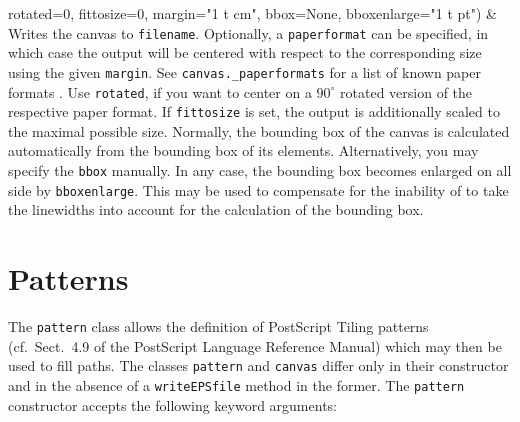 \begin{tabularx}
{      \newline\phantom{writeEPSfile(}rotated=0,
      \newline\phantom{writeEPSfile(}fittosize=0, 
      \newline\phantom{writeEPSfile(}margin="1 t cm",
      \newline\phantom{writeEPSfile(}bbox=None,
      \newline\phantom{writeEPSfile(}bboxenlarge="1 t pt")} &
  Writes the canvas to \texttt{filename}. Optionally, a
  \texttt{paperformat} can be specified, in which case the output will
  be centered with respect to the corresponding size using the given
  \texttt{margin}. See \texttt{canvas.\_paperformats} for a list of
  known paper formats . Use \texttt{rotated}, if you want to center on
  a $90^\circ$ rotated version of the respective paper format. If
  \texttt{fittosize} is set, the output is additionally scaled to the
  maximal possible size. Normally, the bounding box of the canvas is 
  calculated automatically from the bounding box of its elements.
  Alternatively, you may specify the \texttt{bbox} manually. In any
  case, the bounding box becomes enlarged on all side by
  \texttt{bboxenlarge}. This may be used to compensate for the
  inability of \PyX{} to take the linewidths into account for the
  calculation of the bounding box.
\end{tabularx} 
\medskip

\section{Patterns}

The \texttt{pattern} class allows the definition of PostScript Tiling
patterns (cf.\ Sect.~4.9 of the PostScript Language Reference Manual)
which may then be used to fill paths. The classes \texttt{pattern} and
\texttt{canvas} differ only in their constructor and in the absence of
a \texttt{writeEPSfile} method in the former. The \texttt{pattern}
constructor accepts the following keyword arguments:

